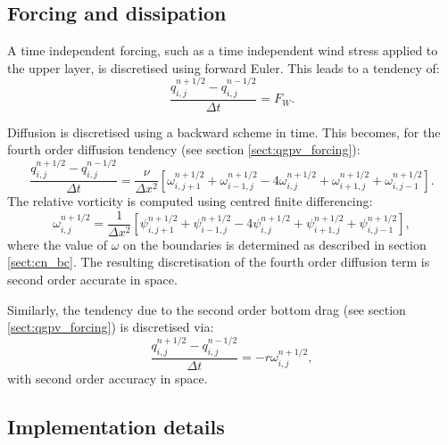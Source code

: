 \documentclass[a4paper]{book}
\begin{document}
\subsection{Forcing and dissipation}

A time independent forcing, such as a time independent wind stress applied to
the upper layer, is discretised using forward Euler. This
leads to a tendency of:
\begin{equation}
  \frac{q^{n + 1 / 2}_{i,j} - q^{n - 1 / 2}_{i,j}}{\Delta t} = F_W.
\end{equation}

Diffusion is discretised using a backward scheme in time. This becomes, for the
fourth order diffusion tendency (see section \ref{sect:qgpv_forcing}):
\begin{equation}
  \frac{q^{n + 1 / 2}_{i,j} - q^{n - 1 / 2}_{i,j}}{\Delta t} = \frac{\nu}{\Delta x^2} \left[ \omega^{n + 1 / 2}_{i,j + 1} + \omega^{n + 1 / 2}_{i - 1,j} - 4 \omega^{n + 1 / 2}_{i,j} + \omega^{n + 1 / 2}_{i + 1,j} + \omega^{n + 1 / 2}_{i,j - 1} \right].
\end{equation}
The relative vorticity is computed using centred finite differencing:
\begin{equation}
  \omega^{n + 1 / 2}_{i,j} = \frac{1}{\Delta x^2} \left[ \psi^{n + 1 / 2}_{i,j + 1} + \psi^{n + 1 / 2}_{i - 1,j} - 4 \psi^{n + 1 / 2}_{i,j} + \psi^{n + 1 / 2}_{i + 1,j} + \psi^{n + 1 / 2}_{i,j - 1} \right],
\end{equation}
where the value of $\omega$ on the boundaries is determined as described in
section \ref{sect:cn_bc}. The resulting
discretisation of the fourth order diffusion term is second order
accurate in space.

Similarly, the tendency due to the second order bottom drag (see section
\ref{sect:qgpv_forcing}) is discretised via:
\begin{equation}
  \frac{q^{n + 1 / 2}_{i,j} - q^{n - 1 / 2}_{i,j}}{\Delta t} = -r \omega^{n + 1 / 2}_{i,j},
\end{equation}
with second order accuracy in space.

\subsection{Implementation details}\label{sect:cabaret_implementation}
\end{document}
